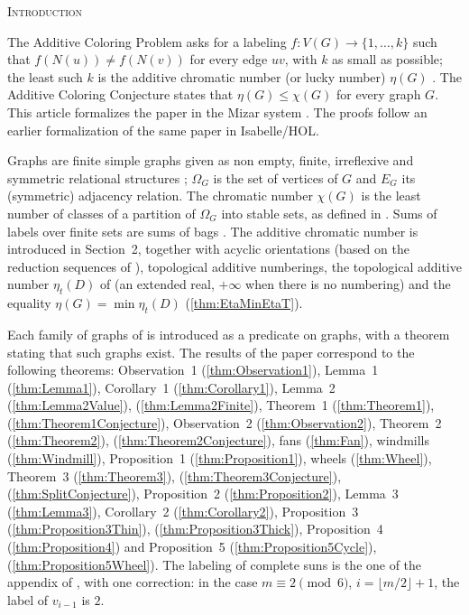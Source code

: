 \documentclass[10pt]{article}
\newcommand{\fmkeep}{\par\vskip 0pt plus 8\baselineskip\penalty-200
  \vskip 0pt plus -8\baselineskip}
\newcommand{\fmunnumbered}[1]{%
  \fmkeep\bigskip\begin{center}\normalsize\scshape #1\end{center}\nopagebreak\smallskip}
\newcommand{\thref}[1]{(\ref{thm:#1})}
\begin{document}
\fmunnumbered{Introduction}

The Additive Coloring Problem asks for a labeling $f : V(G) \to
\{1,\ldots,k\}$ such that $f(N(u)) \neq f(N(v))$ for every edge $uv$, with
$k$ as small as possible; the least such $k$ is the additive chromatic number
(or lucky number) $\eta(G)$ \cite{czerwinski}. The Additive Coloring
Conjecture states that $\eta(G) \leq \chi(G)$ for every graph $G$. This
article formalizes the paper \cite{severin} in the Mizar system
\cite{mizar,fourdecades}. The proofs follow an earlier formalization of the
same paper in Isabelle/HOL.

Graphs are finite simple graphs given as non empty, finite, irreflexive and
symmetric relational structures \cite{necklace}; $\Omega_G$ is the set of
vertices of $G$ and $E_G$ its (symmetric) adjacency relation. The chromatic
number $\chi(G)$ is the least number of classes of a partition of $\Omega_G$
into stable sets, as defined in \cite{mycielsk,dilworth}. Sums of labels
over finite sets are sums of bags \cite{uproots,nat5}. The additive chromatic
number is introduced in Section~2, together with acyclic orientations
(based on the reduction sequences of \cite{rewrite1}), topological additive
numberings, the topological additive number $\eta_t(D)$ of \cite{marenco}
(an extended real, $+\infty$ when there is no numbering) and the equality
$\eta(G) = \min \eta_t(D)$ \thref{EtaMinEtaT}.

Each family of graphs of \cite{severin} is introduced as a predicate on
graphs, with a theorem stating that such graphs exist. The results of the
paper correspond to the following theorems: Observation~1
\thref{Observation1}, Lemma~1 \thref{Lemma1}, Corollary~1
\thref{Corollary1}, Lemma~2 \thref{Lemma2Value}, \thref{Lemma2Finite},
Theorem~1 \thref{Theorem1}, \thref{Theorem1Conjecture}, Observation~2
\thref{Observation2}, Theorem~2 \thref{Theorem2},
\thref{Theorem2Conjecture}, fans \thref{Fan}, windmills \thref{Windmill},
Proposition~1 \thref{Proposition1}, wheels \thref{Wheel}, Theorem~3
\thref{Theorem3}, \thref{Theorem3Conjecture}, \thref{SplitConjecture},
Proposition~2 \thref{Proposition2}, Lemma~3 \thref{Lemma3}, Corollary~2
\thref{Corollary2}, Proposition~3 \thref{Proposition3Thin},
\thref{Proposition3Thick}, Proposition~4 \thref{Proposition4} and
Proposition~5 \thref{Proposition5Cycle}, \thref{Proposition5Wheel}. The
labeling of complete suns is the one of the appendix of \cite{severin}, with
one correction: in the case $m \equiv 2 \pmod 6$, $i = \lfloor m/2\rfloor +
1$, the label of $v_{i-1}$ is $2$.
\end{document}
